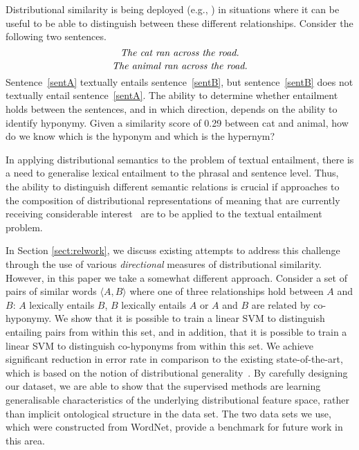 \documentclass[11pt]{article}
\begin{document}
Distributional similarity is being deployed (e.g., ) in situations where it can be useful to be able to distinguish between these different relationships. Consider the following two sentences.
\begin{equation}
\label{sentA}
\mbox{\em The cat ran across the road.}
\end{equation}
\begin{equation}
\label{sentB}
\mbox{\em The animal ran across the road.}
\end{equation}
Sentence~\ref{sentA} textually entails sentence~\ref{sentB}, but sentence~\ref{sentB} does not textually entail sentence~\ref{sentA}. The ability to determine whether entailment holds between the sentences, and in which direction, depends on the ability to identify hyponymy.   Given a similarity score of 0.29 between cat and animal, how do we know which is the hyponym and which is the hypernym? 

In applying distributional semantics to the problem of textual entailment, there is a need to generalise lexical entailment to the phrasal and sentence level. Thus, the ability to distinguish different semantic relations is crucial if approaches to the composition of distributional representations of meaning that are currently receiving considerable interest~\cite{Widdows:08,Mitchell:08,Baroni2010,Grefenstette:11,Socher:12} are to be applied to the textual entailment problem.

In Section \ref{sect:relwork}, we discuss existing attempts to address this challenge through the use of various \emph{directional} measures of distributional similarity.  However, in this paper we take a somewhat different approach. Consider a set of pairs of similar words $\langle A,B\rangle$ where one of three relationships hold between $A$ and $B$: $A$ lexically entails $B$, $B$ lexically entails $A$ or  $A$ and $B$ are related by co-hyponymy. We show  that it is possible to train a linear SVM to distinguish entailing pairs from within this set, and in addition, that it is possible to train a linear SVM to distinguish co-hyponyms from within this set.  We achieve significant reduction in error rate in comparison to the existing state-of-the-art, which is based on the notion of distributional generality~\cite{Weeds2004}.  By carefully designing our dataset, we are able to show that the supervised methods are learning generalisable characteristics of the underlying distributional feature space, rather than implicit ontological structure in the data set. The two data sets we use, which were constructed from WordNet, provide a benchmark for future work in this area. 
\end{document}
